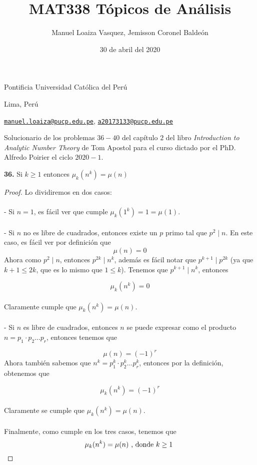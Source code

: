 \documentclass{article}
\title{MAT338 T\'opicos de An\'alisis}
\author{Manuel Loaiza Vasquez, Jemisson Coronel Balde\'on}
\date{30 de abril del 2020}
\newenvironment{statement}[1]{\smallskip\noindent\color[rgb]{1.00,0.00,0.50} {\bf #1.}}{}
\theoremstyle{definition}
\theoremstyle{remark}
\begin{document}
\maketitle


\vspace*{-0.25in}
\centerline{Pontificia Universidad Cat\'olica del Per\'u}
\centerline{Lima, Per\'u}
\centerline{\href{mailto:manuel.loaiza@pucp.edu.pe}{{\tt manuel.loaiza@pucp.edu.pe}}, \href{mailto:   a20173133@pucp.edu.pe}{{\tt a20173133@pucp.edu.pe}}}
\vspace*{0.15in}

\begin{framed}
    Solucionario de los problemas $36 - 40$ del cap\'itulo $2$ del libro {\it Introduction to Analytic Number Theory} de Tom Apostol para el curso dictado por el PhD. Alfredo Poirier el ciclo $2020-1$.
\end{framed}

\begin{statement}{36}
Si $k \geq 1$ entonces $\mu_{k}(n^k) = \mu(n)$
\end{statement}
\begin{proof}
Lo dividiremos en dos casos: \\ \\
- Si $n = 1$, es f\'acil ver que cumple $\mu_{k}(1^{k}) = 1 = \mu(1)$. \\ \\
- Si $n$ no es libre de cuadrados, entonces existe un $p$ primo tal que $p^2 \mid n$. En este caso, es f\'acil ver por definici\'on que
$$\mu(n) = 0$$
Ahora como $p^2 \mid n$, entonces $p^{2k} \mid n^k$, adem\'as es f\'acil notar que $p^{k + 1} \mid p^{2k}$ (ya que $k + 1 \leq 2k$, que es lo mismo que $1 \leq k$). Tenemos que $p^{k + 1} \mid n^k$, entonces 

$$\mu_{k}(n^{k}) = 0$$ \\
Claramente cumple que $\mu_{k}(n^k) = \mu(n)$. \\ \\
- Si $n$ es libre de cuadrados, entonces $n$ se puede expresar como el producto $n = p_1\cdot p_2\dots p_r$, entonces tenemos que 

$$\mu(n) = (-1)^r$$
Ahora tambi\'en sabemos que $n^k = p_1^k\cdot p_2^k \dots p_r^k$, entonces por la definici\'on, obtenemos que 

$$\mu_{k}(n^k) = (-1)^r$$ \\
Claramente se cumple que $\mu_{k}(n^k) = \mu(n)$. \\ \\
Finalmente, como cumple en los tres casos, tenemos que
$$\mu_k(n^{k}) = \mu(n) \hbox{ , donde $k \geq 1$ } $$
\end{proof}
\end{document}

